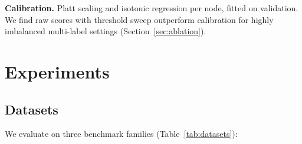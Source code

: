 \documentclass[11pt,a4paper]{article}
\begin{document}
\textbf{Calibration.} Platt scaling and isotonic regression per node,
fitted on validation. We find raw scores with threshold sweep
outperform calibration for highly imbalanced multi-label settings
(Section~\ref{sec:ablation}).

\section{Experiments}

\subsection{Datasets}

We evaluate on three benchmark families (Table~\ref{tab:datasets}):
\end{document}
